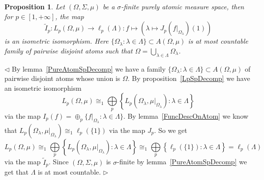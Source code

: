 \documentclass[12pt]{article}
\newtheorem{proposition}[theorem]{Proposition}
\newenvironment{proof}{\par $\triangleleft$}{$\triangleright$}
\begin{document}
\begin{proposition}\label{DescOfLpSpOnPureAtomMeasSp} Let $(\Omega,\Sigma,\mu)$
    be a $\sigma$-finite purely atomic measure space, then for $p\in[1,+\infty]$,
    the map
    $$
        \widetilde{I}_p:L_p(\Omega,\mu)\to \ell_p(\Lambda):
        f\mapsto\left (\lambda\mapsto J_p(f|_{\Omega_\lambda})(1)\right)
    $$
    is an isometric isomorphism. Here
    $ \{\Omega_\lambda:\lambda\in\Lambda \}\subset A(\Omega,\mu)$
    is at most countable family of pairwise disjoint
    atoms such that $\Omega=\bigcup_{\lambda\in\Lambda}\Omega_\lambda$.
\end{proposition}
\begin{proof}
    By lemma~\ref{PureAtomSpDecomp} we have a family $
        \{\Omega_\lambda:\lambda\in\Lambda \}\subset A(\Omega,\mu)$ of pairwise
    disjoint atoms whose union is $\Omega$. By proposition~\ref{LpSpDecomp} we
    have an isometric isomorphism
    $$
        L_p(\Omega,\mu)
        \cong_1 \bigoplus\limits_p
        \left \{
        L_p(\Omega_\lambda,\mu|_{\Omega_\lambda}):\lambda\in\Lambda
        \right \}
    $$
    via the map $I_p(f)=\oplus_p  \{f|_{\Omega_\lambda}:\lambda\in\Lambda \}$.
    By lemma~\ref{FuncDescOnAtom} we know that
    $L_p(\Omega_\lambda,\mu|_{\Omega_\lambda})\cong_1\ell_p( \{1 \})$ via the
    map $J_p$. So we get
    $$
        L_p(\Omega,\mu)
        \cong_1 \bigoplus\limits_p \left \{
        L_p(\Omega_\lambda,\mu|_{\Omega_\lambda}):\lambda\in\Lambda
        \right \}
        \cong_1 \bigoplus\limits_p \left \{
        \ell_p( \{1 \}):\lambda\in\Lambda
        \right \}
        =\ell_p(\Lambda)
    $$
    via the map $\widetilde{I}_p$. Since $(\Omega,\Sigma,\mu)$ is
    $\sigma$-finite by lemma~\ref{PureAtomSpDecomp} we get that $\Lambda$ is at
    most countable.
\end{proof}
\end{document}
